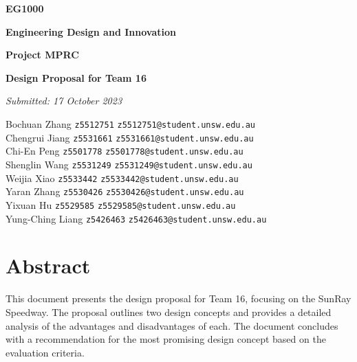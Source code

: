 \documentclass[12pt]{article}
\begin{document}
\begin{titlepage}
    \centering
    \vspace{1cm}
    {\Large \textbf{EG1000} \par}
    \vspace{0.5cm}
    {\Large \textbf{Engineering Design and Innovation} \par}
    \vspace{4cm}
    {\Huge \textbf{Project MPRC} \par}
    \vspace{0.8cm}
    {\Large \textbf{Design Proposal for Team 16} \par}
    \vfill
    {\large \textit{Submitted: 17 October 2023} \par}
    \vspace{1cm}
    
    \begin{tabbing}
        Bochuan Zhang \hspace{2cm} \= \texttt{z5512751} \hspace{2cm} \= \texttt{z5512751@student.unsw.edu.au} \\[10pt]
        Chengrui Jiang\> \texttt{z5531661} \> \texttt{z5531661@student.unsw.edu.au} \\[10pt]
        Chi-En Peng \> \texttt{z5501778} \> \texttt{z5501778@student.unsw.edu.au} \\[10pt]
        Shenglin Wang \> \texttt{z5531249} \> \texttt{z5531249@student.unsw.edu.au} \\[10pt]
        Weijia Xiao \> \texttt{z5533442} \> \texttt{z5533442@student.unsw.edu.au} \\[10pt]
        Yaran Zhang \> \texttt{z5530426} \> \texttt{z5530426@student.unsw.edu.au} \\[10pt]
        Yixuan Hu \> \texttt{z5529585} \> \texttt{z5529585@student.unsw.edu.au} \\[10pt]
        Yung-Ching Liang \> \texttt{z5426463} \> \texttt{z5426463@student.unsw.edu.au} \\[10pt]
    \end{tabbing}
    \vfill
\end{titlepage}

\newpage

\section*{Abstract}
This document presents the design proposal for Team 16, focusing on the SunRay Speedway. The proposal outlines two design concepts and provides a detailed analysis of the advantages and disadvantages of each. The document concludes with a recommendation for the most promising design concept based on the evaluation criteria.
\end{document}
